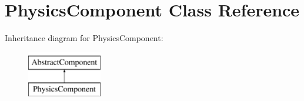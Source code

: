 \hypertarget{classPhysicsComponent}{\section{Physics\-Component Class Reference}
\label{classPhysicsComponent}
}
Inheritance diagram for Physics\-Component\-:\begin{figure}[H]
\begin{center}
\leavevmode
\includegraphics[height=2.000000cm]{classPhysicsComponent}
\end{center}
\end{figure}
